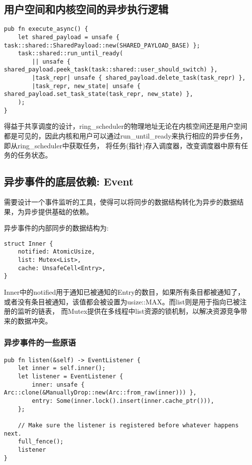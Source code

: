 \subsection{用户空间和内核空间的异步执行逻辑}

\begin{lstlisting}[caption=用户空间的异步逻辑]
pub fn execute_async() {
    let shared_payload = unsafe { task::shared::SharedPayload::new(SHARED_PAYLOAD_BASE) };
    task::shared::run_until_ready(
        || unsafe { shared_payload.peek_task(task::shared::user_should_switch) },
        |task_repr| unsafe { shared_payload.delete_task(task_repr) },
        |task_repr, new_state| unsafe { shared_payload.set_task_state(task_repr, new_state) },
    );
}
\end{lstlisting}

得益于共享调度的设计，ring\_scheduler的物理地址无论在内核空间还是用户空间都是可见的，因此内核和用户可以通过run\_until\_ready来执行相应的异步任务， 即从ring\_scheduler中获取任务， 将任务(指针)存入调度器，改变调度器中原有任务的任务状态。


\subsection{异步事件的底层依赖: Event}

需要设计一个事件监听的工具，使得可以将同步的数据结构转化为异步的数据结果，为异步提供基础的依赖。

异步事件的内部同步的数据结构为:

\begin{lstlisting}[caption=异步事件底层的同步结构]
struct Inner {
    notified: AtomicUsize,
    list: Mutex<List>,
    cache: UnsafeCell<Entry>,
}
\end{lstlisting}

Inner中的notified用于通知已被通知的Entry的数目，如果所有条目都被通知了，或者没有条目被通知，该值都会被设置为usize::MAX。而list则是用于指向已被注册的监听的链表， 而Mutex提供在多线程中list资源的锁机制，以解决资源竞争带来的数据冲突。

\subsubsection{异步事件的一些原语}
\label{sssec:event}

\begin{lstlisting}[caption = 监听者的注册]
pub fn listen(&self) -> EventListener {
    let inner = self.inner();
    let listener = EventListener {
        inner: unsafe { Arc::clone(&ManuallyDrop::new(Arc::from_raw(inner))) },
        entry: Some(inner.lock().insert(inner.cache_ptr())),
    };

    // Make sure the listener is registered before whatever happens next.
    full_fence();
    listener
}
\end{lstlisting}

